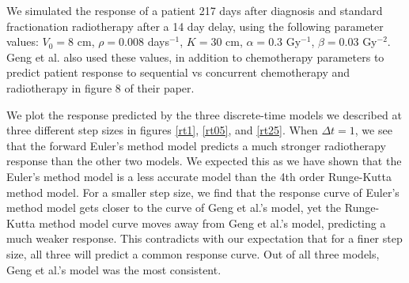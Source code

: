 \documentclass[letterpaper
, superscriptaddress
, twocolumn
, aps
]{revtex4}
\begin{document}
We simulated the response of a patient 217 days after diagnosis and standard fractionation radiotherapy after a 14 day delay, using the following parameter values: $V_{0} = 8$ cm, $\rho = 0.008$ days$^{-1}$, $K = 30$ cm, $\alpha = 0.3$ Gy$^{-1}$, $\beta = 0.03$ Gy$^{-2}$. Geng et al. also used these values, in addition to chemotherapy parameters to predict patient response to sequential vs concurrent chemotherapy and radiotherapy in figure 8 of their paper. 

We plot the response predicted by the three discrete-time models we described at three different step sizes in figures \ref{rt1}, \ref{rt05}, and \ref{rt25}. When $\Delta t = 1$, we see that the forward Euler's method model predicts a much stronger radiotherapy response than the other two models. We expected this as we have shown that the Euler's method model is a less accurate model than the 4th order Runge-Kutta method model. For a smaller step size, we find that the response curve of Euler's method model gets closer to the curve of Geng et al.'s model, yet the Runge-Kutta method model curve moves away from Geng et al.'s model, predicting a much weaker response. This contradicts with our expectation that for a finer step size, all three will predict a common response curve. Out of all three models, Geng et al.'s model was the most consistent.
\end{document}
